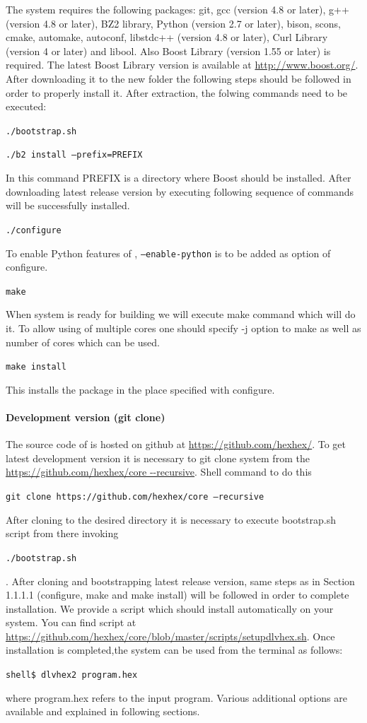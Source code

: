 \documentclass[14pt,a4paper, titlepage]{article}
\begin{document}
The system requires the following packages: git, gcc (version 4.8 or later), g++ (version 4.8 or later), BZ2 library, Python (version 2.7 or later), bison, scons, cmake, automake, autoconf, libstdc++ (version 4.8 or later), Curl Library (version 4 or later) and libool. Also Boost Library (version 1.55 or later) is required. The latest Boost Library version is available at \url{http://www.boost.org/}. After downloading it to the new folder the following steps should be followed in order to properly install it. After extraction, the folwing commands need to be executed:
\\ \centerline{\texttt{./bootstrap.sh}}
\centerline{\texttt{./b2 install --prefix=PREFIX}} In this command PREFIX is a directory where Boost should be installed. After downloading latest release version by executing following sequence of commands \dlvhex{} will be successfully installed.
\\ \centerline{\texttt{./configure}} To enable Python features of \dlvhex{}, \texttt{--enable-python} is to be added as option of configure.
\\ \centerline{\texttt{make}} When system is ready for building we will execute make command which will do it. To allow using of multiple cores one should specify -j option to make as well as number of cores which can be used.
\\ \centerline{\texttt{make install}} This installs the package in the place specified with configure.  
   
\paragraph{Development version (git clone)}
The source code of \dlvhex{} is hosted on github at \url{https://github.com/hexhex/}. To get latest development version it is necessary to git clone system from the \url{https://github.com/hexhex/core --recursive}. Shell command to do this
\\ \centerline{\texttt{git clone https://github.com/hexhex/core --recursive}} 
After cloning to the desired directory it is necessary to execute bootstrap.sh script from there invoking \\ \centerline{\texttt{./bootstrap.sh}}. 
After cloning and bootstrapping latest release version, same steps as in Section 1.1.1.1 (configure, make and make install) will be followed in order to complete installation.
We provide a script which should install \dlvhex{} automatically on your system. You can find script at \url{https://github.com/hexhex/core/blob/master/scripts/setupdlvhex.sh}.
Once installation is completed,the system can be used from the terminal as follows:\\ 
\centerline{\texttt{shell\$ dlvhex2 program.hex}} where program.hex refers to the input program. Various additional options are available and explained in following sections.    
\end{document}
